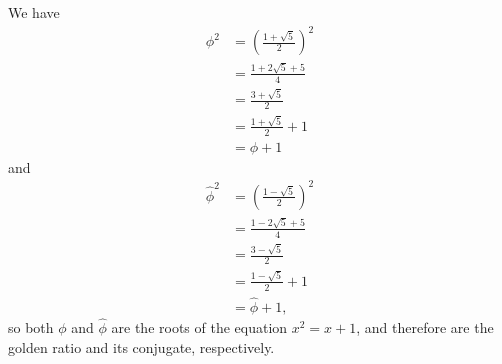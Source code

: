 We have
\begin{align*}
    \phi^2 &= \left(\frac{1+\sqrt{5}}{2}\right)^2 \\
    &= \frac{1+2\sqrt{5}+5}{4} \\[1mm]
    &= \frac{3+\sqrt{5}}{2} \\[1mm]
    &= \frac{1+\sqrt{5}}{2}+1 \\
    &= \phi+1
\end{align*}
and
\begin{align*}
    \widehat\phi^2 &= \left(\frac{1-\sqrt{5}}{2}\right)^2 \\
    &= \frac{1-2\sqrt{5}+5}{4} \\[1mm]
    &= \frac{3-\sqrt{5}}{2} \\[1mm]
    &= \frac{1-\sqrt{5}}{2}+1 \\
    &= \widehat\phi+1,
\end{align*}
so both $\phi$ and $\widehat\phi$ are the roots of the equation $x^2=x+1$, and therefore are the golden ratio and its conjugate, respectively.
